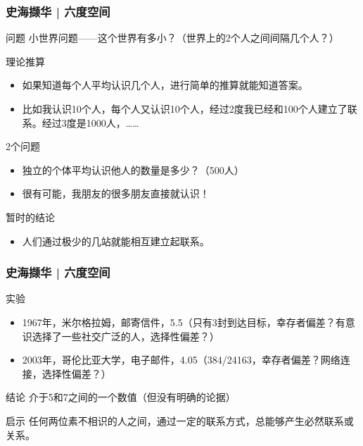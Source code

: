 \begin{frame}
  \frametitle{史海撷华 | 六度空间}
  \begin{block}{问题}
    小世界问题——这个世界有多小？（世界上的2个人之间间隔几个人？）
  \end{block}
  \vspace{-0.5em}
  \pause
  \begin{block}{理论推算}
    \begin{itemize}
      \item 如果知道每个人平均认识几个人，进行简单的推算就能知道答案。
      \item 比如我认识10个人，每个人又认识10个人，经过2度我已经和100个人建立了联系。经过3度是1000人，……
    \end{itemize}
  \end{block}
  \vspace{-0.5em}
  \pause
  \begin{block}{2个问题}
    \begin{itemize}
      \item 独立的个体平均认识他人的数量是多少？（500人）
      \item 很有可能，我朋友的很多朋友直接就认识！
    \end{itemize}
  \end{block}
  \vspace{-0.5em}
  \pause
  \begin{block}{暂时的结论}
    \begin{itemize}
      \item 人们通过极少的几站就能相互建立起联系。
    \end{itemize}
  \end{block}
\end{frame}

\begin{frame}
  \frametitle{史海撷华 | 六度空间}
  \begin{block}{实验}
    \begin{itemize}
      \item 1967年，米尔格拉姆，邮寄信件，5.5（只有3封到达目标，幸存者偏差？有意识选择了一些社交广泛的人，选择性偏差？）
      \item 2003年，哥伦比亚大学，电子邮件，4.05（384/24163，幸存者偏差？网络连接，选择性偏差？）
    \end{itemize}
  \end{block}
  \pause
  \begin{block}{结论}
    介于5和7之间的一个数值（但没有明确的论据）
  \end{block}
  \pause
  \begin{block}{启示}
    任何两位素不相识的人之间，通过一定的联系方式，总能够产生必然联系或关系。
  \end{block}
\end{frame}

